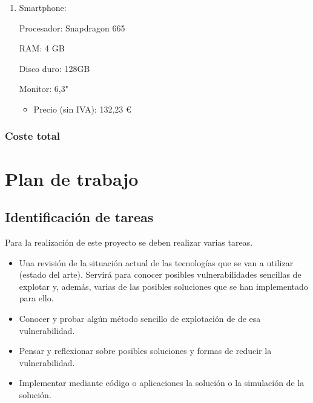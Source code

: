 \documentclass[12pt,a4paper,onecolumn,oneside]{report}
\begin{document}
\begin{enumerate}
	
	\item Smartphone:
	
	Procesador: Snapdragon 665
	
	RAM: 4 GB
	
	Disco duro: 128GB
	
	Monitor: 6,3"
	
	\begin{itemize}
		\item Precio (sin IVA): 132,23 \euro\\
	\end{itemize}
	
\end{enumerate}




\subsubsection{Coste total}

\begin{table}[ht]
	\centering
	\caption{Presupuesto total}
	\label{tabla3}
\end{table}

\section{Plan de trabajo}
\label{Plan de trabajo}


\subsection{Identificación de tareas}

Para la realización de este proyecto se deben realizar varias tareas. 
\begin{itemize}
\item Una revisión de la situación actual de las tecnologías que se van a utilizar (estado del arte). Servirá para conocer posibles vulnerabilidades sencillas de explotar y, además, varias de las posibles soluciones que se han implementado para ello.
\item Conocer y probar algún método sencillo de explotación de de esa vulnerabilidad.
\item Pensar y reflexionar sobre posibles soluciones y formas de reducir la vulnerabilidad.
\item Implementar mediante código o aplicaciones la solución o la simulación de la solución.
\end{itemize}
\end{document}
